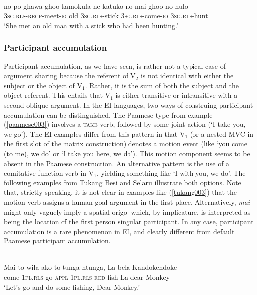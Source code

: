 \ea \label{muna0016}
\\
\gll no-po-ghawa-ghoo kamokula ne-katuko no-mai-ghoo no-hulo \\
3\textsc{sg}.\textsc{rls}-\textsc{recp}-meet-\textsc{io} old 3\textsc{sg}.\textsc{rls}-stick 3\textsc{sg}.\textsc{rls}-come-\textsc{io} 3\textsc{sg}.\textsc{rls}-hunt \\
\glft `She met an old man with a stick who had been hunting.'\\ 
\z

\subsubsection{Participant accumulation}

Participant accumulation, as we have seen, is rather not a typical case of argument sharing because the referent of V$_2$ is not identical with either the subject or the object of V$_1$. Rather, it is the sum of both the subject and the object referent. This entails that V$_1$ is either transitive or intransitive with a second oblique argument. In the EI languages, two ways of construing participant accumulation can be distinguished. The Paamese type from example (\ref{paamese003}) involves a \textsc{take} verb, followed by some joint action (`I take you, we go'). The EI examples differ from this pattern in that V$_1$ (or a nested MVC in the first slot of the matrix construction) denotes a motion event (like `you come (to me), we do' or `I take you here, we do'). This motion component seems to be absent in the Paamese construction. An alternative pattern is the use of a comitative function verb in V$_1$, yielding something like `I with you, we do'. The following examples from Tukang Besi and Selaru illustrate both options. Note that, strictly speaking, it is not clear in examples like (\ref{tukang003}) that the motion verb assigns a human goal argument in the first place. Alternatively, \textit{mai} might only vaguely imply a spatial origo, which, by implicature, is interpreted as being the location of the first person singular participant. In any case, participant accumulation is a rare phenomenon in EI, and clearly different from default Paamese participant accumulation.

\ea \label{tukang003}
\\
\gll Mai to-wila-ako to-tunga-ntunga, La bela Kandokendoke \\
come 1\textsc{pl}.\textsc{rls}-go-\textsc{appl} 1\textsc{pl}.\textsc{rls}-\textsc{red}-fish La dear Monkey \\
\glft `Let's go and do some fishing, Dear Monkey.'\\ 
\z

